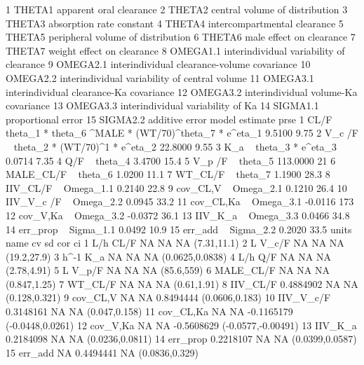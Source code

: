 \begin{Schunk}
\begin{Soutput}
1     THETA1                       apparent oral clearance
2     THETA2                central volume of distribution
3     THETA3                      absorption rate constant
4     THETA4                  intercompartmental clearance
5     THETA5             peripheral volume of distribution
6     THETA6                      male effect on clearance
7     THETA7                    weight effect on clearance
8   OMEGA1.1      interindividual variability of clearance
9   OMEGA2.1   interindividual clearance-volume covariance
10  OMEGA2.2 interindividual variability of central volume
11  OMEGA3.1       interindividual clearance-Ka covariance
12  OMEGA3.2          interindividual volume-Ka covariance
13  OMEGA3.3             interindividual variability of Ka
14  SIGMA1.1                            proportional error
15  SIGMA2.2                                additive error
                                                          model estimate prse
1  CL/F  ~ theta_1 * theta_6 ^MALE * (WT/70)^theta_7  * e^eta_1   9.5100 9.75
2                       V_c /F  ~ theta_2 * (WT/70)^1 * e^eta_2  22.8000 9.55
3                                      K_a  ~ theta_3 * e^eta_3   0.0714 7.35
4                                                Q/F  ~ theta_4   3.4700 15.4
5                                             V_p /F  ~ theta_5 113.0000   21
6                                           MALE_CL/F ~ theta_6   1.0200 11.1
7                                             WT_CL/F ~ theta_7   1.1900 28.3
8                                          IIV_CL/F ~ Omega_1.1   0.2140 22.8
9                                          cov_CL,V ~ Omega_2.1   0.1210 26.4
10                                       IIV_V_c /F ~ Omega_2.2   0.0945 33.2
11                                       cov_CL,Ka  ~ Omega_3.1  -0.0116  173
12                                        cov_V,Ka  ~ Omega_3.2  -0.0372 36.1
13                                         IIV_K_a  ~ Omega_3.3   0.0466 34.8
14                                         err_prop ~ Sigma_1.1   0.0492 10.9
15                                          err_add ~ Sigma_2.2   0.2020 33.5
   units      name        cv        sd        cor                 ci
1    L/h      CL/F        NA        NA         NA        (7.31,11.1)
2      L     V_c/F        NA        NA         NA        (19.2,27.9)
3  h^-1        K_a        NA        NA         NA    (0.0625,0.0838)
4    L/h       Q/F        NA        NA         NA        (2.78,4.91)
5      L     V_p/F        NA        NA         NA         (85.6,559)
6        MALE_CL/F        NA        NA         NA       (0.847,1.25)
7          WT_CL/F        NA        NA         NA        (0.61,1.91)
8         IIV_CL/F 0.4884902        NA         NA      (0.128,0.321)
9         cov_CL,V        NA        NA  0.8494444     (0.0606,0.183)
10       IIV_V_c/F 0.3148161        NA         NA      (0.047,0.158)
11       cov_CL,Ka        NA        NA -0.1165179   (-0.0448,0.0261)
12        cov_V,Ka        NA        NA -0.5608629 (-0.0577,-0.00491)
13         IIV_K_a 0.2184098        NA         NA    (0.0236,0.0811)
14        err_prop 0.2218107        NA         NA    (0.0399,0.0587)
15         err_add        NA 0.4494441         NA     (0.0836,0.329)
\end{Soutput}
\end{Schunk}
